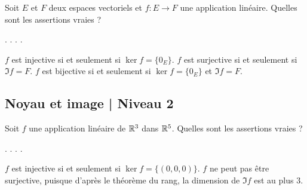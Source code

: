 \begin{question}
Soit $E$ et $F$ deux espaces vectoriels et $f:E\to F$ une application linéaire.
Quelles sont les assertions vraies ?
\begin{answers}  
.
.
.
.
\end{answers}

\begin{explanations} $f$ est injective si et seulement si $\ker f=\{0_E\}$.
\vskip0mm
$f$ est surjective si et seulement si $\Im f=F$.
\vskip0mm
$f$ est bijective si et seulement si $\ker f=\{0_E\}$ et $\Im f=F$.
\end{explanations}
\end{question}


\subsection{Noyau et image  | Niveau 2}

\begin{question}
Soit $f$ une application linéaire de $\mathbb{R}^3$ dans $\mathbb{R}^5$. Quelles sont les assertions vraies ?
\begin{answers}  
.
.
.
.
\end{answers}
\begin{explanations} $f$ est injective si et seulement si $\ker f = \{(0,0,0)\}$. $f$ ne peut pas être surjective, puisque d'après le théorème du rang, la dimension de $\Im f $ est au plus $3$.
\end{explanations}
\end{question}



